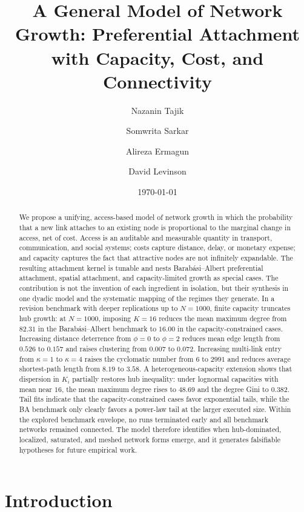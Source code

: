 \documentclass[11pt]{article}
\title{A General Model of Network Growth: Preferential Attachment with Capacity, Cost, and Connectivity}
\author{Nazanin Tajik \and Somwrita Sarkar \and Alireza Ermagun \and David Levinson}
\date{\today}
\begin{document}
\maketitle

\begin{abstract}
We propose a unifying, access-based model of network growth in which the probability that a new link attaches to an existing node is proportional to the marginal change in access, net of cost. Access is an auditable and measurable quantity in transport, communication, and social systems; costs capture distance, delay, or monetary expense; and capacity captures the fact that attractive nodes are not infinitely expandable. The resulting attachment kernel is tunable and nests Barab\'asi--Albert preferential attachment, spatial attachment, and capacity-limited growth as special cases. The contribution is not the invention of each ingredient in isolation, but their synthesis in one dyadic model and the systematic mapping of the regimes they generate. In a revision benchmark with deeper replications up to $N=1000$, finite capacity truncates hub growth: at $N=1000$, imposing $K=16$ reduces the mean maximum degree from $82.31$ in the Barab\'asi--Albert benchmark to $16.00$ in the capacity-constrained cases. Increasing distance deterrence from $\phi=0$ to $\phi=2$ reduces mean edge length from $0.526$ to $0.157$ and raises clustering from $0.007$ to $0.072$. Increasing multi-link entry from $\kappa=1$ to $\kappa=4$ raises the cyclomatic number from $6$ to $2991$ and reduces average shortest-path length from $8.19$ to $3.58$. A heterogeneous-capacity extension shows that dispersion in $K_i$ partially restores hub inequality: under lognormal capacities with mean near $16$, the mean maximum degree rises to $48.69$ and the degree Gini to $0.382$. Tail fits indicate that the capacity-constrained cases favor exponential tails, while the BA benchmark only clearly favors a power-law tail at the larger executed size. Within the explored benchmark envelope, no runs terminated early and all benchmark networks remained connected. The model therefore identifies when hub-dominated, localized, saturated, and meshed network forms emerge, and it generates falsifiable hypotheses for future empirical work.
\end{abstract}

\section{Introduction}
\end{document}
